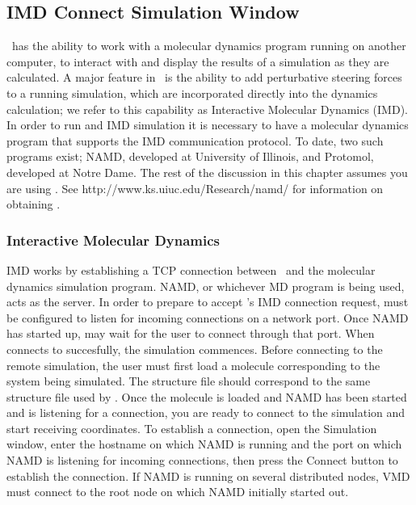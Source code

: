 \subsection{IMD Connect Simulation Window}
\label{ug:ui:window:sim}

\VMD\ has the ability to work with a molecular dynamics program
running on another computer, to interact with and display the results 
of a simulation as they are calculated.
A major feature in \VMD\ is the ability to add
perturbative steering forces to a running simulation, which are
incorporated directly into the dynamics calculation;
we refer to this capability as Interactive Molecular Dynamics (IMD).  
In order to run and IMD simulation it is necessary to have a molecular 
dynamics program that supports the IMD communication protocol.  
To date, two such programs exist; NAMD, developed at University of Illinois,
and Protomol, developed at Notre Dame.
The rest of the discussion in this chapter assumes you are using \NAMD.
See 
{http://www.ks.uiuc.edu/Research/namd/} for information on obtaining \NAMD.

\subsubsection{Interactive Molecular Dynamics}
IMD works by establishing a TCP connection between \VMD\ and the 
molecular dynamics simulation program.  NAMD, or whichever MD program is 
being used, acts as the server. 
In order to prepare \NAMD to accept \VMD's IMD connection request, 
\NAMD must be configured to listen for incoming connections on a network port.
Once NAMD has started up, may wait for the user to connect through 
that port.  When \VMD connects to \NAMD succesfully, the simulation commences.
Before connecting to the remote simulation, the \VMD user must first load a 
molecule corresponding to the system being simulated.  The structure file
should correspond to the same structure file used by \NAMD.
Once the molecule is loaded and NAMD has been started and is listening for a 
connection, you are ready to connect to the simulation and start receiving 
coordinates.  To establish a connection, open the Simulation window, enter 
the hostname
on which NAMD is running and the port on which NAMD is listening for incoming
connections, then press the Connect button to establish the connection.
If NAMD is running on several distributed nodes, VMD must connect to the root 
node on which NAMD initially started out.  

